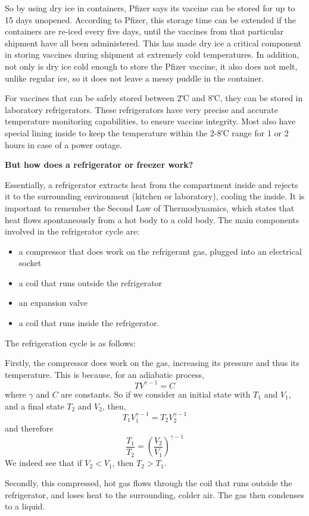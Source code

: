 \documentclass[11pt]{report}
\begin{document}
So by using dry ice in containers, Pfizer says its vaccine can be stored for up to 15 days unopened. According to Pfizer, this storage time can be extended if the containers are re-iced every five days, until the vaccines from that particular shipment have all been administered. This has made dry ice a critical component in storing vaccines during shipment at extremely cold temperatures. In addition, not only is dry ice cold enough to store the Pfizer vaccine, it also does not melt, unlike regular ice, so it does not leave a messy puddle in the container.

For vaccines that can be safely stored between 2℃ and 8℃, they can be stored in laboratory refrigerators. These refrigerators have very precise and accurate temperature monitoring capabilities, to ensure vaccine integrity. Most also have special lining inside to keep the temperature within the 2-8℃ range for 1 or 2 hours in case of a power outage.

\textbf{But how does a refrigerator or freezer work?}

Essentially, a refrigerator extracts heat from the compartment inside and rejects it to the surrounding environment (kitchen or laboratory), cooling the inside. 
It is important to remember the Second Law of Thermodynamics, which states  that heat flows spontaneously from a hot body to a cold body. 
The main components involved in the refrigerator cycle are:
\begin{itemize}
    \item a compressor that does work on the refrigerant gas, plugged into an electrical socket
    \item a coil that runs outside the refrigerator 
    \item an expansion valve
    \item a coil that runs inside the refrigerator.
\end{itemize}

The refrigeration cycle is as follows:

Firstly, the compressor does work on the gas, increasing its pressure and thus its temperature. This is because, for an adiabatic process,
$$TV^{\gamma -1} = C$$
where $\gamma$ and $C$ are constants. So if we consider an initial state with $T_1$ and $V_1$, and a final state $T_2$ and $V_2$, then,
$$T_1V^{\gamma -1}_1 = T_2V^{\gamma -1}_2$$
and therefore
$$\frac{T_1}{T_2} = \left(\frac{V_2}{V_1}\right)^{\gamma - 1}$$
We indeed see that if $V_2 < V_1$, then $T_2 > T_1$.

Secondly, this compressed, hot gas flows through the coil that runs outside the refrigerator, and loses heat to the surrounding, colder air. The gas then condenses to a liquid.
\end{document}
